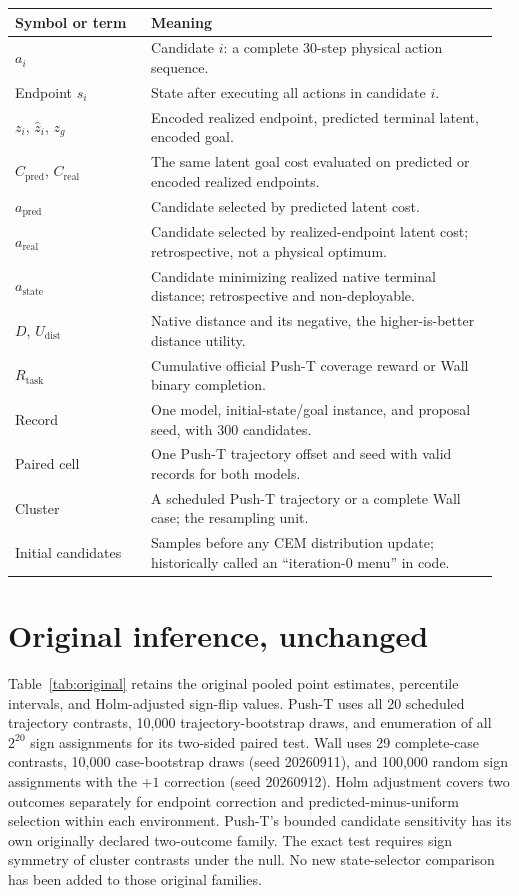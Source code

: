 \documentclass{article}
\begin{document}
\begin{table}[h]
\centering
\begin{tabular}{@{}p{0.27\linewidth}p{0.69\linewidth}@{}}
\toprule
Symbol or term & Meaning\\
\midrule
$a_i$ & Candidate $i$: a complete 30-step physical action sequence.\\
Endpoint $s_i$ & State after executing all actions in candidate $i$.\\
$z_i$, $\hat z_i$, $z_g$ & Encoded realized endpoint, predicted terminal latent, encoded goal.\\
$C_{\mathrm{pred}}$, $C_{\mathrm{real}}$ & The same latent goal cost evaluated on predicted or encoded realized endpoints.\\
$a_{\mathrm{pred}}$ & Candidate selected by predicted latent cost.\\
$a_{\mathrm{real}}$ & Candidate selected by realized-endpoint latent cost; retrospective, not a physical optimum.\\
$a_{\mathrm{state}}$ & Candidate minimizing realized native terminal distance; retrospective and non-deployable.\\
$D$, $U_{\mathrm{dist}}$ & Native distance and its negative, the higher-is-better distance utility.\\
$R_{\mathrm{task}}$ & Cumulative official Push-T coverage reward or Wall binary completion.\\
Record & One model, initial-state/goal instance, and proposal seed, with 300 candidates.\\
Paired cell & One Push-T trajectory offset and seed with valid records for both models.\\
Cluster & A scheduled Push-T trajectory or a complete Wall case; the resampling unit.\\
Initial candidates & Samples before any CEM distribution update; historically called an ``iteration-0 menu'' in code.\\
\bottomrule
\end{tabular}
\end{table}

\section{Original inference, unchanged}
\label{app:original}

Table~\ref{tab:original} retains the original pooled point estimates, percentile
intervals, and Holm-adjusted sign-flip values. Push-T uses all 20 scheduled
trajectory contrasts, 10,000 trajectory-bootstrap draws, and enumeration of
all $2^{20}$ sign assignments for its two-sided paired test. Wall uses 29
complete-case contrasts, 10,000 case-bootstrap draws (seed 20260911), and
100,000 random sign assignments with the $+1$ correction (seed 20260912).
Holm adjustment covers two outcomes separately for endpoint correction and
predicted-minus-uniform selection within each environment. Push-T's bounded
candidate sensitivity has its own originally declared two-outcome family.
The exact test requires sign symmetry of cluster contrasts under the null.
No new state-selector comparison has been added to those original families.
\end{document}
